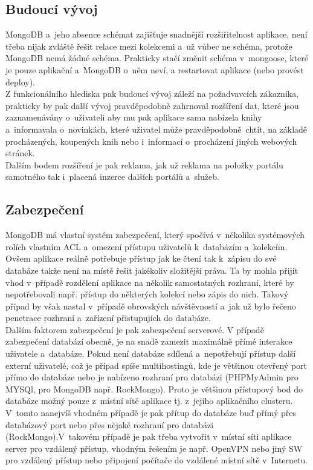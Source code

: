 \documentclass[a4paper,12pt,twoside,BCOR=10mm]{article}
\begin{document}
\subsection{Budoucí vývoj}
MongoDB a~jeho absence schémat zajišťuje snadnější rozšiřitelnost aplikace, není třeba nijak zvláště řešit relace mezi kolekcemi a~už vůbec ne schéma, protože MongoDB nemá žádné schéma. Prakticky stačí změnit schéma v~mongoose, které je pouze aplikační a~MongoDB o~něm neví, a restartovat aplikace (nebo provést deploy).\\

Z funkcionálního hlediska pak budoucí vývoj záleží na požadvavcích zákazníka, prakticky by pak další vývoj pravděpodobně zahrnoval rozšíření dat, které jsou zaznamenávány o~uživateli aby mu pak aplikace sama nabízela knihy a~informavala o~novinkách, které uživatel může pravděpodobně chtít, na základě procházených, koupených knih nebo i~informací o~procházení jiných webových stránek.\\

Dalším bodem rozšíření je pak reklama, jak už reklama na položky portálu samotného tak i~placená inzerce dalších portálů a~služeb.\\

\subsection{Zabezpečení}
MongoDB má vlastní systém zabezpečení, který spočívá v~několika systémových rolích vlastním ACL a~omezení přístupu uživatelů k~databázím a~kolekcím. Ovšem aplikace reálně potřebuje přístup jak ke čtení tak k~zápisu do své databáze takže není na místě řešit jakékoliv složitější práva. Ta by mohla přijít vhod v~případě rozdělení aplikace na několik samostatných rozhraní, které by nepotřebovali např. přístup do některých kolekcí nebo zápis do nich. Takový případ by však nastal v~případě obrovských návštěvností a~jak už bylo řečeno penetrace rozhraní a~zařízení přistupujích do databáze.\\

Dalším faktorem zabezpečení je pak zabezpečení serverové. V případě zabezpečení databází obecně, je na snadě zamezit maximálně přímé interakce uživatele a~databáze. Pokud není databáze sdílená a~nepotřebují přístup další externí uživatelé, což je případ spíše multihostingů, kde je většinou otevřený port přímo do databáze nebo je nabízeno rozhraní pro databázi (PHPMyAdmin pro MYSQl, pro MongoDB např. RockMongo). Proto je většinou přístupový bod do databáze možný pouze z~místní sítě aplikace tj. z~jejího aplikačního clusteru. V~tomto nanejvíš vhodném případě je pak přítup do databáze buď přímý přes databázový port nebo přes nějaké rozhraní pro databázi (RockMongo).V~takovém případě je pak třeba vytvořit v~místní síti aplikace server pro vzdálený přístup, vhodným řešením je např. OpenVPN nebo jiný SW pro vzdálený přístup nebo připojení počítače do vzdálené místní sítě v~Internetu.
\end{document}
